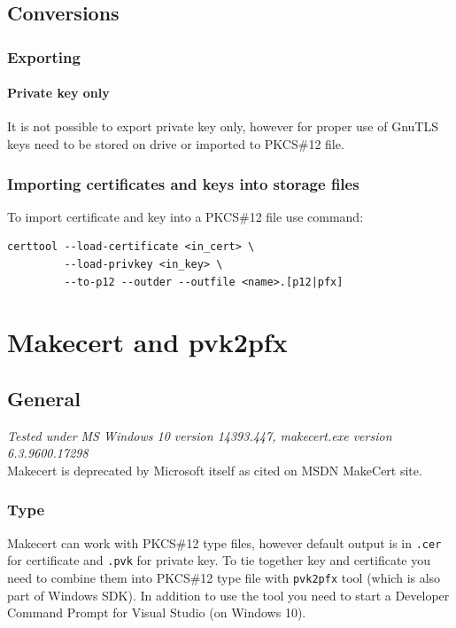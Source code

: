 \documentclass[10pt, a4paper]{report}
\begin{document}
\section{Conversions}

  \subsection{Exporting}
  
    \subsubsection{Private key only}
It is not possible to export private key only, however for proper use of GnuTLS keys need to be stored on drive or imported to PKCS\#12 file.
  \subsection{Importing certificates and keys into storage files}
To import certificate and key into a PKCS\#12 file use command:
\begin{verbatim}
certtool --load-certificate <in_cert> \
         --load-privkey <in_key> \
         --to-p12 --outder --outfile <name>.[p12|pfx]
\end{verbatim}   



\chapter{Makecert and pvk2pfx}

\section{General}

\textit{Tested under MS Windows 10 version 14393.447, makecert.exe version 6.3.9600.17298} \\
Makecert is deprecated by Microsoft itself as cited on MSDN MakeCert site.

  \subsection{Type}
Makecert can work with PKCS\#12 type files, however  default output is in \verb+.cer+ for certificate and \verb+.pvk+ for private key. To tie together key and certificate you need to combine them into PKCS\#12 type file with \verb+pvk2pfx+ tool (which is also part of Windows SDK). In addition to use the tool you need to start a Developer Command Prompt for Visual Studio (on Windows 10). 
\end{document}
